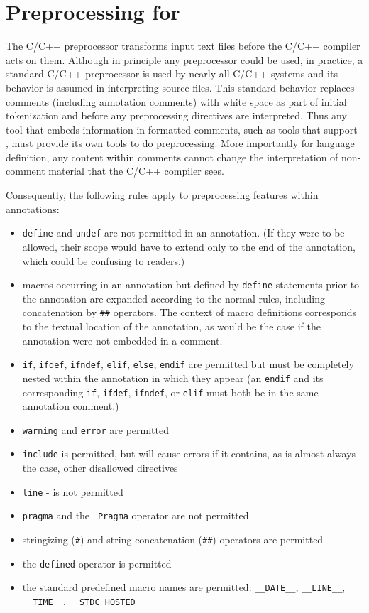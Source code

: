 \section{Preprocessing for \NAME}
\label{sec:ppimpl}

The C/C++ preprocessor transforms input text files before the C/C++ compiler acts on them. 
Although in principle any preprocessor could be used, in practice, a
standard C/C++ preprocessor is used by nearly all C/C++ systems and its behavior is assumed in interpreting source files. 
This standard behavior 
replaces comments (including \NAME annotation comments) with white space as part of initial tokenization and before any preprocessing directives are
interpreted.
Thus any tool that embeds information in formatted comments, such as tools that support \NAME, must provide its own tools to do preprocessing.
More importantly for language definition, any content within comments cannot change the interpretation of non-comment material that the C/C++ compiler sees.

Consequently, the following rules apply to preprocessing features within \NAME annotations:
\begin{itemize}
	\item \texttt{define} and \texttt{undef} are not permitted in an annotation. (If they were to be allowed, their scope would have to extend only to the end of the annotation, which could be confusing to readers.)
	\item macros occurring in an annotation but defined by \texttt{define} statements prior to the annotation are expanded according to the normal rules, including concatenation by \texttt{\#\#} operators. 
	The context of macro definitions corresponds to the textual location of the annotation, as would be the case if the
	annotation were not embedded in a comment.
	\item \texttt{if}, \texttt{ifdef}, \texttt{ifndef}, \texttt{elif}, \texttt{else}, \texttt{endif} are permitted but must be completely nested within the annotation in which they appear (an \texttt{endif} and its corresponding \texttt{if}, \texttt{ifdef}, \texttt{ifndef}, or \texttt{elif} must both be in the same annotation comment.)
	\item \texttt{warning} and \texttt{error} are permitted
	\item \texttt{include} is permitted, but will cause errors if it contains, as is almost always the case, other disallowed directives
	\item \texttt{line} - is not permitted
	\item \texttt{pragma} and the \texttt{\_Pragma} operator are not permitted
	\item stringizing (\verb|#|) and string concatenation (\verb|##|) operators are permitted
	\item the \verb|defined| operator is permitted
	\item the standard predefined macro names are permitted: 
	\texttt{\_\_DATE\_\_}, 
	\texttt{\_\_LINE\_\_},
    \texttt{\_\_TIME\_\_},
	\texttt{\_\_STDC\_HOSTED\_\_}
\end{itemize}




